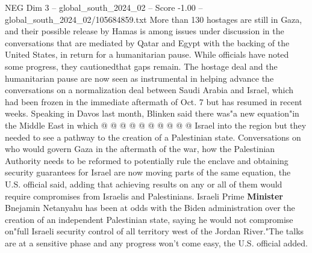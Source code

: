 \begin{textsample}{NEG Dim 3 – global\_south\_2024\_02 – Score -1.00 – global\_south\_2024\_02/105684859.txt}
More than 130 hostages are still in Gaza, and their possible release by Hamas is among issues under discussion in the conversations that are mediated by Qatar and Egypt with the backing of the United States, in return for a humanitarian pause.
While officials have noted some progress, they cautionedthat gaps remain.
The hostage deal and the humanitarian pause are now seen as instrumental in helping advance the conversations on a normalization deal between Saudi Arabia and Israel, which had been frozen in the immediate aftermath of Oct. 7 but has resumed in recent weeks.
Speaking in Davos last month, Blinken said there was"a new equation"in the Middle East in which @ @ @ @ @ @ @ @ @ @ Israel into the region but they needed to see a pathway to the creation of a Palestinian state.
Conversations on who would govern Gaza in the aftermath of the war, how the Palestinian Authority needs to be reformed to potentially rule the enclave and obtaining security guarantees for Israel are now moving parts of the same equation, the U.S. official said, adding that achieving results on any or all of them would require compromises from Israelis and Palestinians.
Israeli Prime \textbf{Minister} Bnejamin Netanyahu has been at odds with the Biden administration over the creation of an independent Palestinian state, saying he would not compromise on"full Israeli security control of all territory west of the Jordan River."The talks are at a sensitive phase and any progress won't come easy, the U.S. official added.

\end{textsample}
